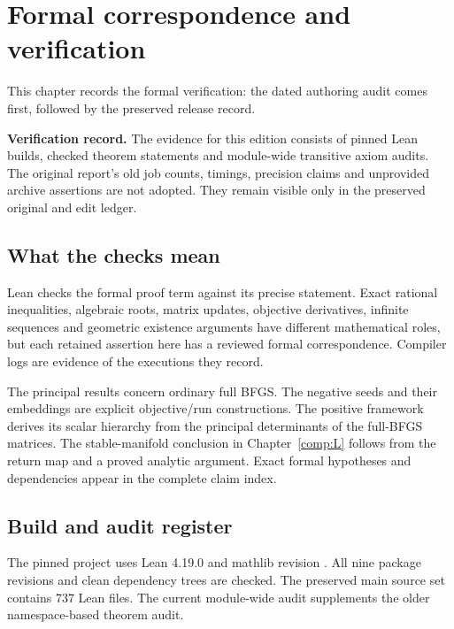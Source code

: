 \chapter{Formal correspondence and verification}\label{comp:E}\label{E:chapter}
\renewcommand{\ModuleTag}{14}
This chapter records the formal verification: the dated authoring audit comes first, followed by the preserved release record.



\textbf{Verification record.} The evidence for this edition consists of pinned Lean builds, checked theorem statements and module-wide transitive axiom audits. The original report's old job counts, timings, precision claims and unprovided archive assertions are not adopted. They remain visible only in the preserved original and edit ledger.



\section{What the checks mean}\label{what-the-checks-mean}

Lean checks the formal proof term against its precise statement. Exact rational inequalities, algebraic roots, matrix updates, objective derivatives, infinite sequences and geometric existence arguments have different mathematical roles, but each retained assertion here has a reviewed formal correspondence. Compiler logs are evidence of the executions they record.

The principal results concern ordinary full BFGS. The negative seeds and their embeddings are explicit objective/run constructions. The positive framework derives its scalar hierarchy from the principal determinants of the full-BFGS matrices. The stable-manifold conclusion in Chapter~\ref{comp:L} follows from the return map and a proved analytic argument. Exact formal hypotheses and dependencies appear in the complete claim index.



\section{Build and audit register}\label{fresh-execution-register}

The pinned project uses Lean 4.19.0 and mathlib revision
.
All nine package revisions and clean dependency trees are checked. The preserved main source set contains 737 Lean files. The current module-wide audit supplements the older namespace-based theorem audit.

